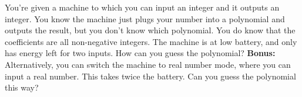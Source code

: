 \begin{problem}
    You're given a machine to which you can input an integer and it outputs an integer. You know the machine just plugs your number into a polynomial and outputs the result, but you don't know which polynomial. You do know that the coefficients are all non-negative integers. The machine is at low battery, and only has energy left for two inputs. How can you guess the polynomial? \textbf{Bonus:} Alternatively, you can switch the machine to real number mode, where you can input a real number. This takes twice the battery. Can you guess the polynomial this way?
\end{problem}
